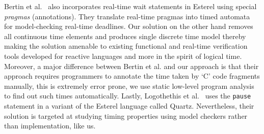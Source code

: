 Bertin et al.~\cite{Bertin:2000:TVR:1947412.1947439} also incorporates
real-time wait statements in Esterel using special \textit{pragmas}
(annotations). They translate real-time pragmas into timed
automata~\cite{alur94} for model-checking real-time deadlines. Our
solution on the other hand removes all continuous time elements and
produces single discrete time model thereby making the solution amenable
to existing functional and real-time verification tools developed for
reactive languages and more in the spirit of logical time. Moreover, a
major difference between Bertin et al. and our approach is that their
approach requires programmers to annotate the time taken by `C' code
fragments manually, this is extremely error prone, we use static
low-level program analysis to find out such times automatically.
Lastly, Logothethis et al.~\cite{glog02} uses the \texttt{pause}
statement in a variant of the Esterel language called Quartz.
Nevertheless, their solution is targeted at studying timing properties
using model checkers rather than implementation, like us.
















